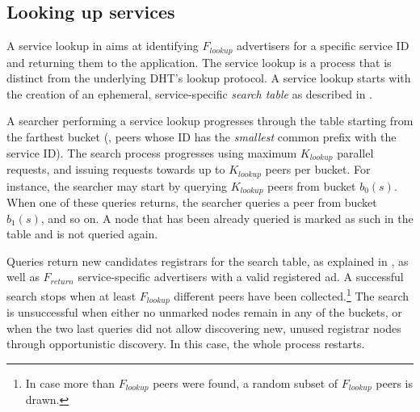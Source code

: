 \subsection{Looking up services}
\label{sec:lookup}

A service lookup in \sysname aims at identifying $F_\textit{lookup}$ advertisers for a specific service ID and returning them to the application.
The service lookup is a process that is distinct from the underlying DHT's lookup protocol.
A service lookup starts with the creation of an ephemeral, service-specific \emph{search table} as described in .

A searcher performing a service lookup progresses through the table starting from the farthest bucket (\ie, peers whose ID has the \emph{smallest} common prefix with the service ID).
The search process progresses using maximum $K_\textit{lookup}$ parallel requests, and issuing requests towards up to $K_\textit{lookup}$ peers per bucket.
For instance, the searcher may start by querying $K_\textit{lookup}$ peers from bucket $b_0(s)$.
When one of these queries returns, the searcher queries a peer from bucket $b_1(s)$, and so on.
A node that has been already queried is marked as such in the table and is not queried again.

Queries return new candidates registrars for the search table, as explained in , as well as $F_\textit{return}$ service-specific advertisers with a valid registered ad.
A successful search stops when at least $F_\textit{lookup}$ different peers have been collected.\footnote{In case more than $F_\textit{lookup}$ peers were found, a random subset of $F_\textit{lookup}$ peers is drawn.}
The search is unsuccessful when either no unmarked nodes remain in any of the buckets, or when the two last queries did not allow discovering new, unused registrar nodes through opportunistic discovery.
In this case, the whole process restarts.

